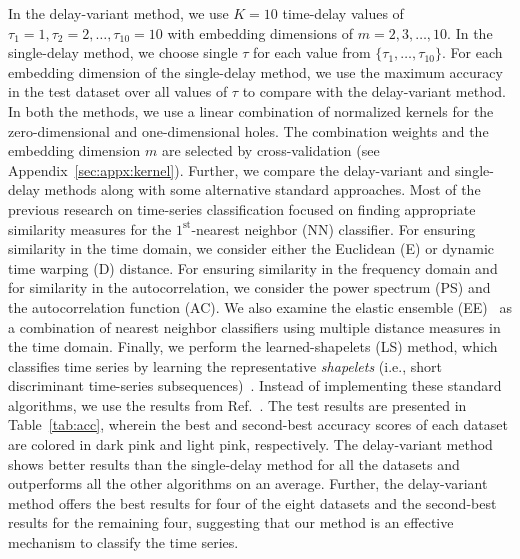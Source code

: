 \documentclass[twocolumn,pre,amsmath,amssymb]{revtex4-1}
\begin{document}
In the delay-variant method, we use $K=10$ time-delay values of $\tau_1=1,\tau_2=2,\ldots,\tau_{10}=10$
with embedding dimensions of $m=2,3,\ldots,10$.
In the single-delay method, we choose single $\tau$ for each value from $\{\tau_1,\ldots,\tau_{10} \}$.
For each embedding dimension of the single-delay method, 
we use the maximum accuracy in the test dataset over 
all values of $\tau$ to compare with the delay-variant method.
In both the methods, we use a linear combination of normalized kernels for the zero-dimensional and one-dimensional holes.
The combination weights and the embedding dimension $m$ are selected by cross-validation (see Appendix~\ref{sec:appx:kernel}).
Further, we compare the delay-variant and single-delay methods
along with some alternative standard approaches.
Most of the previous research on time-series classification 
focused on finding appropriate similarity measures for the $1^{\text{st}}$-nearest neighbor (NN) classifier. 
For ensuring similarity in the time domain, we consider either the Euclidean (E) or dynamic time warping (D) distance.
For ensuring similarity in the frequency domain and for similarity in the autocorrelation, 
we consider the power spectrum (PS) and the autocorrelation function (AC). 
We also examine the elastic ensemble (EE)~\cite{lines:ee:2014} 
as a combination of nearest neighbor classifiers using multiple distance measures in the time domain.
Finally, we perform the learned-shapelets (LS) method, 
which classifies time series by learning the representative \textit{shapelets} (i.e., short discriminant time-series subsequences)~\cite{grabocka:LST:2014}.
Instead of implementing these standard algorithms, 
we use the results from Ref.~\cite{bagnall:review:2016,tscresults}.
The test results are presented in Table~\ref{tab:acc}, 
wherein the best and second-best accuracy scores of each dataset 
are colored in dark pink and light pink, respectively. 
The delay-variant method shows better results than
the single-delay method for all the datasets and outperforms all the other algorithms on an average. 
Further, the delay-variant method offers the best results for four of the eight datasets 
and the second-best results for the remaining four,
suggesting that our method is an effective mechanism to classify the time series.
\end{document}
